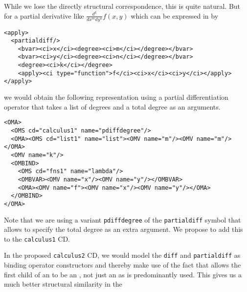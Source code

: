 \documentclass[12pt]{article}
\begin{document}
While we lose the directly structural correspondence, this is quite natural. But for a
partial derivative like $\frac{d^k}{dx^m dy^n}f(x,y)$ which can be expressed in {\mathml}
by

\begin{lstlisting}[language=MathML]
<apply>
  <partialdiff/>
    <bvar><ci>x</ci><degree><ci>m</ci></degree></bvar>
    <bvar><ci>y</ci><degree><ci>n</ci></degree></bvar>
    <degree><ci>k</ci></degree>
    <apply><ci type="function">f</ci><ci>x</ci><ci>y</ci></apply>
</apply>
\end{lstlisting}
we would obtain the following representation using a partial differentiation operator that
takes a list of degrees and a total degree as an arguments.
\begin{lstlisting}[language=OpenMath]
<OMA>
  <OMS cd="calculus1" name="pdiffdegree"/>
  <OMA><OMS cd="list1" name="list"><OMV name="m"/><OMV name="m"/></OMA>
  <OMV name="k"/>
  <OMBIND>
    <OMS cd="fns1" name="lambda"/>
    <OMBVAR><OMV name="x"/><OMV name="y"/></OMBVAR>
    <OMA><OMV name="f"><OMV name="x"/><OMV name="y"/></OMA>
  </OMBIND>
</OMA>
\end{lstlisting}
Note that we are using a variant {\texttt{pdiffdegree}} of the {\texttt{partialdiff}}
symbol that allows to specify the total degree as an extra argument. We propose to add
this to the {\texttt{calculus1}} CD.

In the proposed {\texttt{calculus2}} CD, we would model the {\texttt{diff}} and
{\texttt{partialdiff}} as binding operator constructors and thereby make use of the fact
that {\openmath} allows the first child of an {} to be an {},
not just an {} as is predominantly used. This gives us a much better
structural similarity in the
\end{document}

